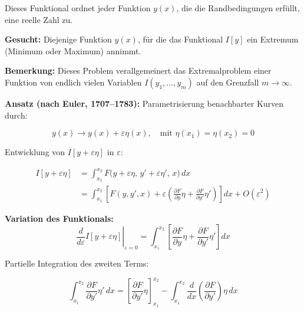 \documentclass[10pt, letterpaper]{article}
\begin{document}
Dieses Funktional ordnet jeder Funktion \( y(x) \), die die Randbedingungen erfüllt, eine reelle Zahl zu.

\vspace{1em}
\textbf{Gesucht:} Diejenige Funktion \( y(x) \), für die das Funktional \( I[y] \) ein Extremum (Minimum oder Maximum) annimmt.

\begin{center}
\end{center}

\textbf{Bemerkung:} Dieses Problem verallgemeinert das Extremalproblem einer Funktion von endlich vielen Variablen \( I(y_1, \dots, y_m) \) auf den Grenzfall \( m \to \infty \).

\vspace{1em}
\textbf{Ansatz (nach Euler, 1707–1783):} Parametrisierung benachbarter Kurven durch:

\[
y(x) \longrightarrow y(x) + \varepsilon \eta(x), \quad \text{mit } \eta(x_1) = \eta(x_2) = 0
\]

Entwicklung von \( I[y + \varepsilon \eta] \) in \( \varepsilon \):

\begin{align*}
I[y + \varepsilon \eta] &= \int_{x_1}^{x_2} F\big(y + \varepsilon \eta, \, y' + \varepsilon \eta', \, x\big)\, dx \\
&= \int_{x_1}^{x_2} \left[ F(y, y', x) + \varepsilon \left( \frac{\partial F}{\partial y}\eta + \frac{\partial F}{\partial y'}\eta' \right) \right] dx + O(\varepsilon^2)
\end{align*}

\textbf{Variation des Funktionals:}
\[
\left. \frac{d}{d\varepsilon} I[y + \varepsilon \eta] \right|_{\varepsilon=0} = \int_{x_1}^{x_2} \left[ \frac{\partial F}{\partial y} \eta + \frac{\partial F}{\partial y'} \eta' \right] dx
\]

Partielle Integration des zweiten Terms:

\[
\int_{x_1}^{x_2} \frac{\partial F}{\partial y'} \eta'\, dx = 
\left[ \frac{\partial F}{\partial y'} \eta \right]_{x_1}^{x_2}
- \int_{x_1}^{x_2} \frac{d}{dx} \left( \frac{\partial F}{\partial y'} \right) \eta\, dx
\]
\end{document}
